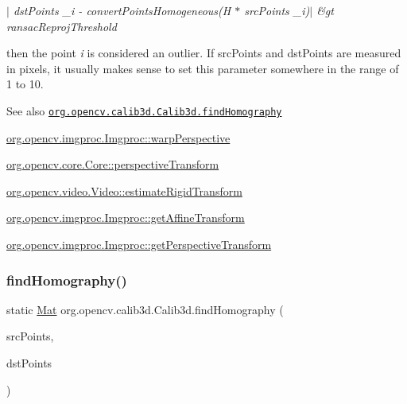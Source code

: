 {\itshape $\vert$ dst\+Points \+\_\+i -\/ convert\+Points\+Homogeneous(\+H $\ast$ src\+Points \+\_\+i)$\vert$ \&gt ransac\+Reproj\+Threshold}

then the point {\itshape i} is considered an outlier. If {\ttfamily src\+Points} and {\ttfamily dst\+Points} are measured in pixels, it usually makes sense to set this parameter somewhere in the range of 1 to 10.

\begin{DoxySeeAlso}{See also}
\href{http://docs.opencv.org/modules/calib3d/doc/camera_calibration_and_3d_reconstruction.html#findhomography}{\tt org.\+opencv.\+calib3d.\+Calib3d.\+find\+Homography} 

\mbox{\hyperlink{classorg_1_1opencv_1_1imgproc_1_1_imgproc_aad167fa9fe0009a54f7732488102938c}{org.\+opencv.\+imgproc.\+Imgproc\+::warp\+Perspective}} 

\mbox{\hyperlink{classorg_1_1opencv_1_1core_1_1_core_a1ff0eace0f00e79af5228fdae120342a}{org.\+opencv.\+core.\+Core\+::perspective\+Transform}} 

\mbox{\hyperlink{classorg_1_1opencv_1_1video_1_1_video_ad9c2fbb377a485b9619be2c78eaf7cee}{org.\+opencv.\+video.\+Video\+::estimate\+Rigid\+Transform}} 

\mbox{\hyperlink{classorg_1_1opencv_1_1imgproc_1_1_imgproc_a283e61c00d4e6ba9625264d8d7f5f8db}{org.\+opencv.\+imgproc.\+Imgproc\+::get\+Affine\+Transform}} 

\mbox{\hyperlink{classorg_1_1opencv_1_1imgproc_1_1_imgproc_ab3727363e269af640d5254f76e14ddb6}{org.\+opencv.\+imgproc.\+Imgproc\+::get\+Perspective\+Transform}} 
\end{DoxySeeAlso}
\mbox{\label{classorg_1_1opencv_1_1calib3d_1_1_calib3d_aa3e6fd7652b2fc4c4d19064b39523dae}} 
\subsubsection{\texorpdfstring{find\+Homography()}{findHomography()}\hspace{0.1cm}{\footnotesize\ttfamily [3/3]}}
{\footnotesize\ttfamily static \mbox{\hyperlink{classorg_1_1opencv_1_1core_1_1_mat}{Mat}} org.\+opencv.\+calib3d.\+Calib3d.\+find\+Homography (\begin{DoxyParamCaption}\item[{\mbox{\hyperlink{classorg_1_1opencv_1_1core_1_1_mat_of_point2f}{Mat\+Of\+Point2f}}}]{src\+Points,  }\item[{\mbox{\hyperlink{classorg_1_1opencv_1_1core_1_1_mat_of_point2f}{Mat\+Of\+Point2f}}}]{dst\+Points }\end{DoxyParamCaption})\hspace{0.3cm}{\ttfamily [static]}}

